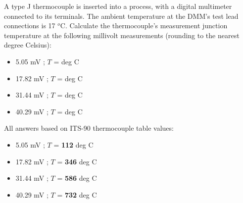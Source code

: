 

A type J thermocouple is inserted into a process, with a digital multimeter connected to its terminals.  The ambient temperature at the DMM's test lead connections is 17 $^{o}$C.  Calculate the thermocouple's measurement junction temperature at the following millivolt measurements (rounding to the nearest degree Celsius):

\begin{itemize}
\item{} 5.05 mV ; $T$ = \underbar{\hskip 50pt} deg C
\vskip 10pt
\item{} 17.82 mV ; $T$ = \underbar{\hskip 50pt} deg C 
\vskip 10pt
\item{} 31.44 mV ; $T$ = \underbar{\hskip 50pt} deg C
\vskip 10pt
\item{} 40.29 mV ; $T$ = \underbar{\hskip 50pt} deg C 
\end{itemize}







All answers based on ITS-90 thermocouple table values:

\begin{itemize}
\item{} 5.05 mV ; $T$ = {\bf 112} deg C
\vskip 10pt
\item{} 17.82 mV ; $T$ = {\bf 346} deg C 
\vskip 10pt
\item{} 31.44 mV ; $T$ = {\bf 586} deg C
\vskip 10pt
\item{} 40.29 mV ; $T$ = {\bf 732} deg C 
\end{itemize}










